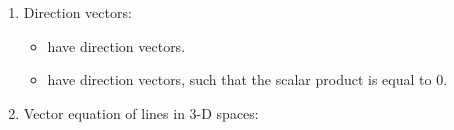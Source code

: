 \documentclass[12pt, a4paper]{article}
\def\d{{\mathrm{d}}}
\begin{document}
\begin{enumerate}
\begin{itemize}
    \begin{theorem}{3.2.3.2}{}
    $$\vec{n}\cdot\left(\vec{p}-\vec{a}\right)=0\ \Rightarrow\ \vec{n}\cdot\vec{p}=\vec{n}\cdot\vec{a}.$$
    \end{theorem}
    \item If the direction vector $\vec{d}=\begin{pmatrix}d_1\\d_2\end{pmatrix}$, then one possible normal vector would be ${\color{red}{\vec{n}=\begin{pmatrix}d_2\\-d_1\end{pmatrix}}}$ or any other vectors parallel to it. 
    \item The vector form: 
    $$\begin{aligned}
      \color{red} \begin{pmatrix}x\\y\end{pmatrix}\cdot\begin{pmatrix}d_2\\-d_1\end{pmatrix}&\color{red}=\begin{pmatrix}x_1\\y_1\end{pmatrix}\cdot\begin{pmatrix}d_2\\-d_1\end{pmatrix}\\
      \color{green} \Rightarrow xd_2-yd_1&\color{green}=x_1d_2-y_1d_1\\
      \color{green}(x-x_1)d_2&\color{green}=yd_1-y_1d_1\\
      \color{red}\therefore y&\color{red}=\frac{d_2}{d_1}(x-x_1)+y_1.
    \end{aligned}$$
  \end{itemize}
  \item Direction vectors: 
  \begin{itemize}
    \item \textbf{\color{red}{Parallel lines}} have \textbf{\color{red}{collinear}} direction vectors. 
    \item \textbf{\color{red}{Perpendicular lines}} have \textbf{\color{red}{orthogonal}} direction vectors, such that the scalar product is equal to 0. 
  \end{itemize}
  \item Vector equation of lines in 3-D spaces: 
  \begin{itemize}

\end{itemize}
\end{enumerate}
\end{document}
